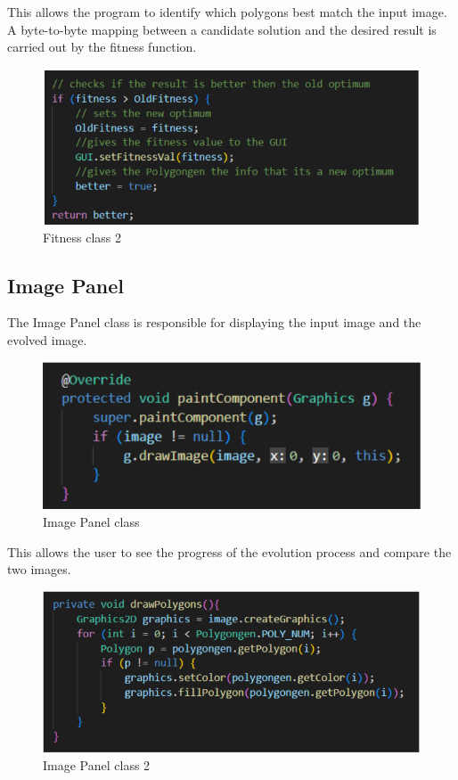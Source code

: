 \newpage
This allows the program to identify which polygons best match the input image. A byte-to-byte mapping between a candidate solution and the desired result is carried out by the fitness function.

\begin{figure}
\centering
\includegraphics[width=4.5in]{images/fitness2.png}
\caption{Fitness class 2}
\end{figure}
\newpage


\subsection{Image Panel}
\label{Image Panel}
The Image Panel class is responsible for displaying the input image and the evolved image. 

\begin{figure}
\centering
\includegraphics[width=4.5in]{images/impa.png}

\caption{Image Panel class}
\end{figure}
This allows the user to see the progress of the evolution process and compare the two images.
\begin{figure}
\centering
\includegraphics[width=4.5in]{images/impa2.png}

\caption{Image Panel class 2}
\end{figure}
\newpage

